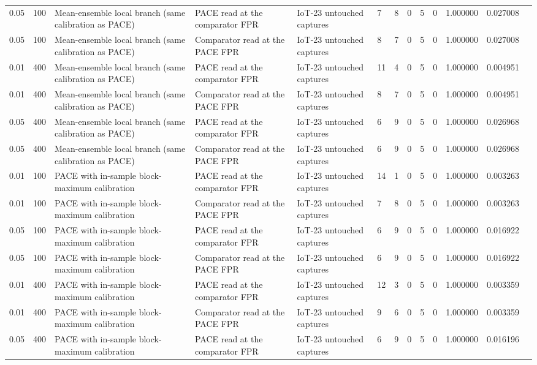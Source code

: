 \begin{tabular}{lllllllllllll}
0.05 & 100 & Mean-ensemble local branch (same calibration as PACE) & PACE read at the comparator FPR & IoT-23 untouched captures & 7 & 8 & 0 & 5 & 0 & 1.000000 & 0.027008 &  \\
0.05 & 100 & Mean-ensemble local branch (same calibration as PACE) & Comparator read at the PACE FPR & IoT-23 untouched captures & 8 & 7 & 0 & 5 & 0 & 1.000000 & 0.027008 &  \\
0.01 & 400 & Mean-ensemble local branch (same calibration as PACE) & PACE read at the comparator FPR & IoT-23 untouched captures & 11 & 4 & 0 & 5 & 0 & 1.000000 & 0.004951 &  \\
0.01 & 400 & Mean-ensemble local branch (same calibration as PACE) & Comparator read at the PACE FPR & IoT-23 untouched captures & 8 & 7 & 0 & 5 & 0 & 1.000000 & 0.004951 &  \\
0.05 & 400 & Mean-ensemble local branch (same calibration as PACE) & PACE read at the comparator FPR & IoT-23 untouched captures & 6 & 9 & 0 & 5 & 0 & 1.000000 & 0.026968 &  \\
0.05 & 400 & Mean-ensemble local branch (same calibration as PACE) & Comparator read at the PACE FPR & IoT-23 untouched captures & 6 & 9 & 0 & 5 & 0 & 1.000000 & 0.026968 &  \\
0.01 & 100 & PACE with in-sample block-maximum calibration & PACE read at the comparator FPR & IoT-23 untouched captures & 14 & 1 & 0 & 5 & 0 & 1.000000 & 0.003263 &  \\
0.01 & 100 & PACE with in-sample block-maximum calibration & Comparator read at the PACE FPR & IoT-23 untouched captures & 7 & 8 & 0 & 5 & 0 & 1.000000 & 0.003263 &  \\
0.05 & 100 & PACE with in-sample block-maximum calibration & PACE read at the comparator FPR & IoT-23 untouched captures & 6 & 9 & 0 & 5 & 0 & 1.000000 & 0.016922 &  \\
0.05 & 100 & PACE with in-sample block-maximum calibration & Comparator read at the PACE FPR & IoT-23 untouched captures & 6 & 9 & 0 & 5 & 0 & 1.000000 & 0.016922 &  \\
0.01 & 400 & PACE with in-sample block-maximum calibration & PACE read at the comparator FPR & IoT-23 untouched captures & 12 & 3 & 0 & 5 & 0 & 1.000000 & 0.003359 &  \\
0.01 & 400 & PACE with in-sample block-maximum calibration & Comparator read at the PACE FPR & IoT-23 untouched captures & 9 & 6 & 0 & 5 & 0 & 1.000000 & 0.003359 &  \\
0.05 & 400 & PACE with in-sample block-maximum calibration & PACE read at the comparator FPR & IoT-23 untouched captures & 6 & 9 & 0 & 5 & 0 & 1.000000 & 0.016196 &  \\

\end{tabular}
